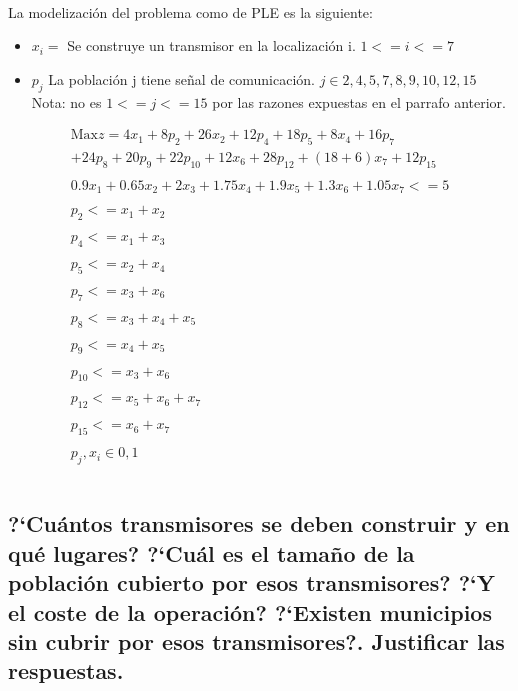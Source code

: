 \documentclass[10pt, a4paper]{article}
\begin{document}
			\paragraph{}
			La modelización del problema como de PLE es la siguiente:

			\begin{itemize}
				\item \(x_{i} = \) Se construye un transmisor en la localización i. $1<= i <= 7$

				\item \(p_{j} \) La población j tiene señal de comunicación. $j \in {2,4,5,7,8,9,10,12,15}$ Nota: no es  $1<= j <= 15$ por las razones expuestas en el parrafo anterior.
			\end{itemize}

			\[
				\begin{split}
					\text{Max} z = 4x_{1} + 8p_{2} + 26x_{2} + 12p_{4} +18p_{5} + 8x_{4} + 16p_{7} \\
						+ 24p_{8} +20p_{9} + 22p_{10}  +  12x_{6} + 28p_{12} + (18+6)x_{7} + 12p_{15} \\ \\
						0.9x_1 + 0.65x_2 + 2x_3 + 1.75x_4 + 1.9x_5 + 1.3x_6 + 1.05 x_7 <= 5 \\ \\
						p_2 <= x_1 + x_2\\ \\
						p_4 <= x_1 + x_3\\ \\
						p_5 <= x_2 + x_4\\ \\
						p_7 <= x_3 + x_6\\ \\
						p_8 <= x_3 + x_4 + x_5\\ \\
						p_9 <= x_4 + x_5\\ \\
						p_{10} <= x_3 + x_6\\ \\
						p_{12} <= x_5 + x_6 + x_7\\ \\
						p_{15} <= x_6 + x_7\\ \\
						p_{j}, x_{i} \in {0,1}\\ \\
				\end{split}
			\]


		\subsection{?`Cuántos transmisores se deben construir y en qué lugares? ?`Cuál es el tamaño de la población cubierto por esos transmisores? ?`Y el coste de la operación? ?`Existen municipios sin cubrir por esos transmisores?. Justificar las respuestas.}
\end{document}
